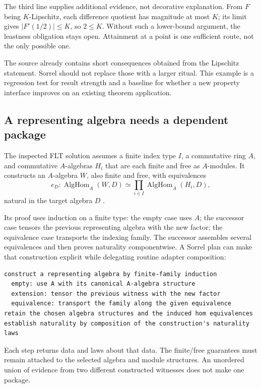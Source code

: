 \documentclass[11pt,a4paper]{article}
\numberwithin{equation}{section}
\theoremstyle{definition}\newtheorem{definition}[theorem]{Definition}
\theoremstyle{remark}\newtheorem{remark}[theorem]{Remark}
\begin{document}
The third line supplies additional evidence, not decorative explanation.
From \(F\) being \(K\)-Lipschitz, each difference quotient has magnitude
at most \(K\); its limit gives \(|F'(1/2)|\le K\), so \(2\le K\).
Without such a lower-bound argument, the leastness obligation stays open.
Attainment at a point is one sufficient route, not the only possible one.

The source already contains short consequences obtained from the Lipschitz
statement. Sorrel should not replace those with a larger ritual. This example
is a regression test for result strength and a baseline for whether a new
property interface improves on an existing theorem application.

\subsection{A representing algebra needs a dependent package}
The inspected FLT solution assumes a finite index type \(I\), a commutative
ring \(A\), and commutative \(A\)-algebras \(H_i\) that are each finite and
free as \(A\)-modules. It constructs an \(A\)-algebra \(W\), also finite and
free, with equivalences
\[
 e_D:\operatorname{AlgHom}_A(W,D)
       \simeq\prod_{i\in I}\operatorname{AlgHom}_A(H_i,D),
\]
natural in the target algebra \(D\) \cite{tensor}.

Its proof uses induction on a finite type: the empty case uses \(A\); the
successor case tensors the previous representing algebra with the new factor;
the equivalence case transports the indexing family. The successor assembles
several equivalences and then proves naturality componentwise. A Sorrel plan
can make that construction explicit while delegating routine adapter
composition:
\begin{lstlisting}
construct a representing algebra by finite-family induction
  empty: use A with its canonical A-algebra structure
  extension: tensor the previous witness with the new factor
  equivalence: transport the family along the given equivalence
retain the chosen algebra structures and the induced hom equivalences
establish naturality by composition of the construction's naturality laws
\end{lstlisting}

Each step returns data and laws about that data. The finite/free guarantees
must remain attached to the selected algebra and module structures. An
unordered union of evidence from two different constructed witnesses does not
make one package.
\end{document}
